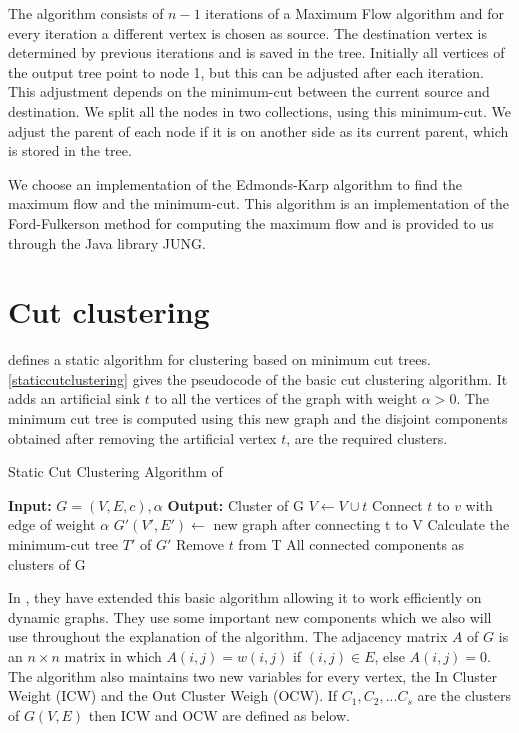 The algorithm consists of $n-1$ iterations of a Maximum Flow algorithm and for every iteration a different vertex is chosen as source. The destination vertex is determined by previous iterations and is saved in the tree. Initially all vertices of the output tree point to node 1, but this can be adjusted after each iteration. This adjustment depends on the minimum-cut between the current source and destination. We split all the nodes in two collections, using this minimum-cut. We adjust the parent of each node if it is on another side as its current parent, which is stored in the tree.

We choose an implementation of the Edmonds-Karp algorithm to find the maximum flow and the minimum-cut. This algorithm is an implementation of the Ford-Fulkerson method for computing the maximum flow and is provided to us through the Java library JUNG.

\section{Cut clustering}

\cite{flake2004graph} defines a static algorithm for clustering based on minimum cut trees. \autoref{staticcutclustering} gives the pseudocode of the basic cut clustering algorithm. It adds an artificial sink $t$ to all the vertices of the graph with weight $\alpha > 0$. The minimum cut tree is computed using this new graph and the disjoint components obtained after removing the artificial vertex $t$, are the required clusters.

\begin{algorithm}
\caption{Static Cut Clustering Algorithm of \cite{flake2004graph}}
\label{staticcutclustering}
\begin{algorithmic}
\STATE \textbf{Input:} $G = (V,E,c), \alpha$ 
\STATE \textbf{Output:} Cluster of G
\STATE $V \leftarrow V \cup t$
	\STATE Connect $t$ to $v$ with edge of weight $\alpha$
\ENDFOR
\STATE $G'(V',E') \leftarrow$ new graph after connecting t to V
\STATE Calculate the minimum-cut tree $T'$ of $G'$
\STATE Remove $t$ from T
\RETURN All connected components as clusters of G
\end{algorithmic}
\end{algorithm}

In \cite{saha2006dynamic}, they have extended this basic algorithm allowing it to work efficiently on dynamic graphs. They use some important new components which we also will use throughout the explanation of the algorithm. The adjacency matrix $A$ of $G$ is an $n \times n$ matrix in which $A(i,j) = w(i,j)$ if $(i,j) \in E$, else $A(i,j) = 0$. The algorithm also maintains two new variables for every vertex, the In Cluster Weight (ICW) and the Out Cluster Weigh (OCW). If $C_1,C_2,...C_s$ are the clusters of $G(V,E)$ then ICW and OCW are defined as below.

